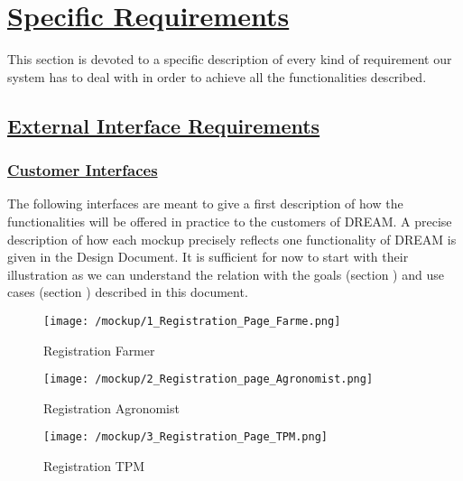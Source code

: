 \section[Specific Requirements]{\hyperlink{toc}{Specific Requirements}}
	\label{sec:specificRequirements}
	This section is devoted to a specific description of every kind of requirement our system has to deal with in order to achieve all the functionalities described.

\subsection[External Interface Requirements]{\hyperlink{toc}{External Interface Requirements}}
	\label{sec:externalInterfaceRequirements}
	
	\subsubsection[Customer Interfaces]{\hyperlink{toc}{Customer Interfaces}}
	\label{sec:customerInterfaces}
	
	The following interfaces are meant to give a first description of how the functionalities will be offered in practice to the customers of DREAM. A precise description of how each mockup precisely reflects one functionality of DREAM is given in the Design Document. It is sufficient for now to start with their illustration as we can understand the relation with the goals (section ) and use cases (section ) described in this document.\\
	
	\vspace{2cm}
	 
	\begin{figure}[ht!]
		\centering
		\begin{minipage}{0.80\textwidth}
			\centering
			\texttt{[image: /mockup/1\_Registration\_Page\_Farme.png]}
			\caption{Registration Farmer}
		\end{minipage}\hfill
	\end{figure}

	\begin{figure}[ht!]
		\centering
		\begin{minipage}{0.5\textwidth}
			\centering
			\texttt{[image: /mockup/2\_Registration\_page\_Agronomist.png]}
			\caption{Registration Agronomist}
		\end{minipage}\hfill
		\begin{minipage}{0.5\textwidth}
			\centering
			\texttt{[image: /mockup/3\_Registration\_Page\_TPM.png]}
			\caption{Registration TPM}
		\end{minipage}
	\end{figure}

